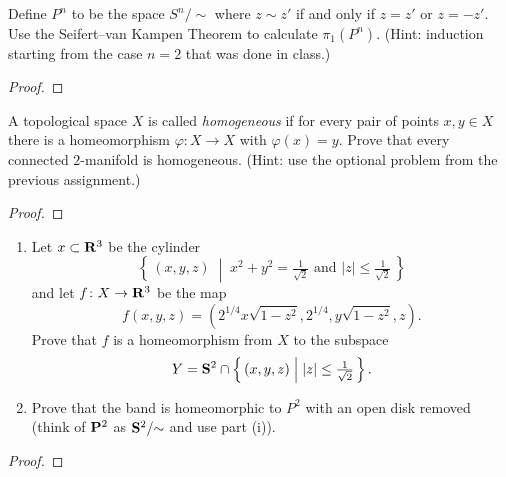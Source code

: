 \newpage
\begin{problem}[A]
Define $P^n$ to be the space $S^n/{\sim}$ where $z\sim z'$ if and only if
$z=z'$ or $z=-z'$. Use the Seifert--van Kampen Theorem to calculate
$\pi_1(P^n)$. (Hint: induction starting from the case $n=2$ that was done
in class.)
\end{problem}
\begin{proof}
\end{proof}
\newpage
\begin{problem}[B]
A topological space $X$ is called \emph{homogeneous} if for every pair of
points $x,y\in X$ there is a homeomorphism $\varphi\colon X\to X$ with
$\varphi(x)=y$. Prove that every connected $2$-manifold is
homogeneous. (Hint: use the optional problem from the previous assignment.)
\end{problem}
\begin{proof}
\end{proof}
\newpage
\begin{problem}
\begin{enumerate}[label=(\roman*)]
\item Let $x\subset\mathbf{R}^3$ be the cylinder
\[
\left\{\,(x,y,z)\;\middle|\;
\text{$x^2+y^2=\tfrac{1}{\sqrt{2}}$ and $|z|\leq \tfrac{1}{\sqrt{2}}$}\,\right\}
\]
and let $f\colon X\to\mathbf{R}^3$ be the map
\[
f(x,y,z)=\left(2^{1/4}x\sqrt{1-z^2},2^{1/4},y\sqrt{1-z^2},z\right).
\]
Prove that $f$ is a homeomorphism from $X$ to the subspace
\[
Y=\mathbf{S}^2\cap\left\{\,(x,y,z)\;\middle|\;|z|\leq\tfrac{1}{\sqrt{2}}\,\right\}.
\]
\item Prove that the  band is homeomorphic to $P^2$ with an
  open disk removed (think of $\mathbf{P}^2$ as $\mathbf{S}^2/{\sim}$ and use part (i)).
\end{enumerate}
\end{problem}
\begin{proof}
\end{proof}


